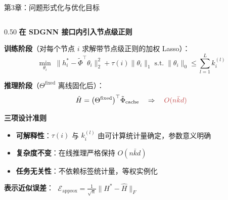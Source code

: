 \documentclass[aspectratio=169,9pt,xcolor=dvipsnames]{beamer}
\newcommand{\blue}[1]{\textcolor{mynavy}{#1}}
\newcommand{\kbar}{\ensuremath{\bar{k}}}
\begin{document}
\begin{frame}{第3章：问题形式化与优化目标}
  \begin{columns}[T]
    \begin{column}{0.50\textwidth}
      \textbf{\blue{在 SDGNN 接口内引入节点级正则}}

      \textbf{训练阶段}（对每个节点 $i$ 求解带节点级正则的加权 Lasso）：
      \begin{equation*}
        \min_{\theta_i}\;
        \bigl\|h_i^* - \tilde{\Phi}^{\top}\theta_i\bigr\|_2^2
        +\tau(i)\|\theta_i\|_1
        \;\text{s.t.}\;
        \|\theta_i\|_0 \leq \textstyle\sum_{l=1}^{L}k_i^{(l)}
      \end{equation*}

      \textbf{推理阶段}（$\Theta^{\mathrm{fixed}}$ 离线固化后）：
      \begin{equation*}
        \hat{H}=\bigl(\Theta^{\mathrm{fixed}}\bigr)^{\top}\tilde{\Phi}_{\mathrm{cache}}
        \quad\Rightarrow\quad {\color{myred}O(n\kbar d)}
      \end{equation*}

      \vspace{0.2cm}
      \textbf{\blue{三项设计准则}}
      \begin{itemize}
        \item \textbf{可解释性}：$\tau(i)$ 与 $k_i^{(l)}$ 由可计算统计量确定，参数意义明确
        \item \textbf{复杂度不变}：在线推理严格保持 $O(n\kbar d)$
        \item \textbf{任务无关性}：不依赖标签统计量，等权实例化
      \end{itemize}

      \vspace{0.2cm}
      \textbf{表示近似误差}：
      $\;\mathcal{E}_{\mathrm{approx}} = \frac{1}{\sqrt{n}}\|H^*-\hat{H}\|_F$
    \end{column}


\end{columns}
\end{frame}
\end{document}
